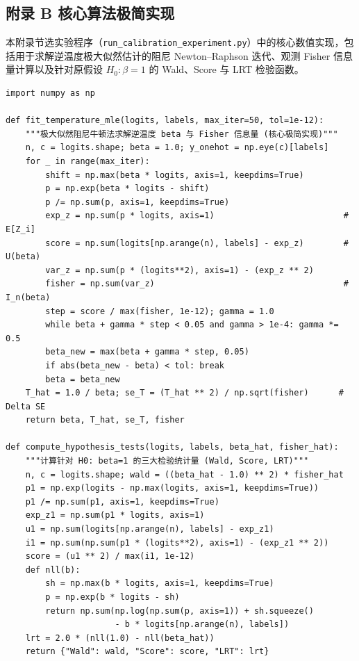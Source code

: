 {}
\subsection*{附录 B 核心算法极简实现}

本附录节选实验程序（\texttt{run\_calibration\_experiment.py}）中的核心数值实现，包括用于求解逆温度极大似然估计的阻尼 Newton--Raphson 迭代、观测 Fisher 信息量计算以及针对原假设 $H_0:\beta=1$ 的 Wald、Score 与 LRT 检验函数。

\begin{center}\footnotesize
\begin{verbatim}
import numpy as np

def fit_temperature_mle(logits, labels, max_iter=50, tol=1e-12):
    """极大似然阻尼牛顿法求解逆温度 beta 与 Fisher 信息量 (核心极简实现)"""
    n, c = logits.shape; beta = 1.0; y_onehot = np.eye(c)[labels]
    for _ in range(max_iter):
        shift = np.max(beta * logits, axis=1, keepdims=True)
        p = np.exp(beta * logits - shift)
        p /= np.sum(p, axis=1, keepdims=True)
        exp_z = np.sum(p * logits, axis=1)                          # E[Z_i]
        score = np.sum(logits[np.arange(n), labels] - exp_z)        # U(beta)
        var_z = np.sum(p * (logits**2), axis=1) - (exp_z ** 2)
        fisher = np.sum(var_z)                                      # I_n(beta)
        step = score / max(fisher, 1e-12); gamma = 1.0
        while beta + gamma * step < 0.05 and gamma > 1e-4: gamma *= 0.5
        beta_new = max(beta + gamma * step, 0.05)
        if abs(beta_new - beta) < tol: break
        beta = beta_new
    T_hat = 1.0 / beta; se_T = (T_hat ** 2) / np.sqrt(fisher)      # Delta SE
    return beta, T_hat, se_T, fisher

def compute_hypothesis_tests(logits, labels, beta_hat, fisher_hat):
    """计算针对 H0: beta=1 的三大检验统计量 (Wald, Score, LRT)"""
    n, c = logits.shape; wald = ((beta_hat - 1.0) ** 2) * fisher_hat
    p1 = np.exp(logits - np.max(logits, axis=1, keepdims=True))
    p1 /= np.sum(p1, axis=1, keepdims=True)
    exp_z1 = np.sum(p1 * logits, axis=1)
    u1 = np.sum(logits[np.arange(n), labels] - exp_z1)
    i1 = np.sum(np.sum(p1 * (logits**2), axis=1) - (exp_z1 ** 2))
    score = (u1 ** 2) / max(i1, 1e-12)
    def nll(b):
        sh = np.max(b * logits, axis=1, keepdims=True)
        p = np.exp(b * logits - sh)
        return np.sum(np.log(np.sum(p, axis=1)) + sh.squeeze()
                      - b * logits[np.arange(n), labels])
    lrt = 2.0 * (nll(1.0) - nll(beta_hat))
    return {"Wald": wald, "Score": score, "LRT": lrt}
\end{verbatim}
\end{center}

